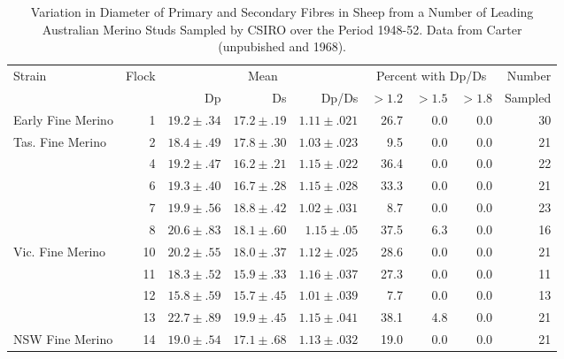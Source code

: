 %

\begin{landscape}
\begin{table}
\centering
\caption{Variation in Diameter of Primary and Secondary Fibres in Sheep from a Number of Leading Australian Merino Studs Sampled by CSIRO over the Period 1948-52. Data from Carter (unpubished and 1968).}
\label{tb:3}
\vspace{0.1in}
\begin{tabular}{l|r|rrr|rrr|r}  \hline
 Strain & Flock & \multicolumn{3}{c|}{Mean} &  \multicolumn{3}{c|}{Percent with Dp/Ds} &  Number \\ \cline{3-8}
        &       & Dp & Ds & Dp/Ds &   $>1.2$ &  $>1.5$ & $>1.8$ & Sampled \\ \hline

Early Fine Merino      &  1    &  $19.2\pm.34$   & $17.2\pm.19$  & $1.11\pm.021$  & 26.7  & 0.0  & 0.0  & 30 \\ \hline
 
Tas. Fine Merino       &  2    &  $18.4\pm.49$   & $17.8\pm.30$  & $1.03\pm.023$  &  9.5  & 0.0  & 0.0  & 21 \\
                       &  4    &  $19.2\pm.47$   & $16.2\pm.21$  & $1.15\pm.022$  & 36.4  & 0.0  & 0.0  & 22 \\
                       &  6    &  $19.3\pm.40$   & $16.7\pm.28$  & $1.15\pm.028$  & 33.3  & 0.0  & 0.0  & 21 \\
                       &  7    &  $19.9\pm.56$   & $18.8\pm.42$  & $1.02\pm.031$  &  8.7  & 0.0  & 0.0  & 23 \\
                       &  8    &  $20.6\pm.83$   & $18.1\pm.60$  & $1.15\pm.05 $  & 37.5  & 6.3  & 0.0  & 16 \\ \hline

Vic. Fine Merino       & 10    &  $20.2\pm.55$   & $18.0\pm.37$  & $1.12\pm.025$  & 28.6  & 0.0  & 0.0  & 21 \\
                       & 11    &  $18.3\pm.52$   & $15.9\pm.33$  & $1.16\pm.037$  & 27.3  & 0.0  & 0.0  & 11 \\
                       & 12    &  $15.8\pm.59$   & $15.7\pm.45$  & $1.01\pm.039$  &  7.7  & 0.0  & 0.0  & 13 \\
                       & 13    &  $22.7\pm.89$   & $19.9\pm.45$  & $1.15\pm.041$  & 38.1  & 4.8  & 0.0  & 21 \\ \hline

NSW Fine Merino        & 14    &  $19.0\pm.54$   & $17.1\pm.68$  & $1.13\pm.032$  & 19.0  & 0.0  & 0.0  & 21 \\ \hline


\end{tabular}
\end{table}
\end{landscape}
